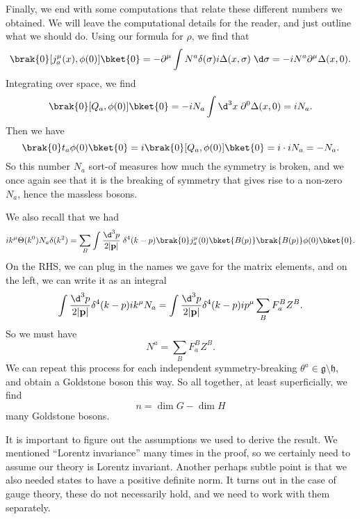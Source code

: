 \documentclass[a4paper]{article}
\begin{document}
Finally, we end with some computations that relate these different numbers we obtained. We will leave the computational details for the reader, and just outline what we should do. Using our formula for $\rho$, we find that
\[
  \brak{0} [j_a^\mu(x), \phi(0)] \bket{0} = - \partial^\mu \int N^a \delta (\sigma) i \Delta(x, \sigma) \;\d \sigma = -iN^a \partial^\mu \Delta(x, 0).
\]
Integrating over space, we find
\[
  \brak{0}[Q_a, \phi(0)]\bket{0} = - iN_a \int \d^3 x\; \partial^0 \Delta(x, 0) = i N_a.
\]
Then we have
\[
  \brak{0} t_a \phi(0)\bket{0} = i \brak{0} [Q_a, \phi(0)]\bket{0} = i \cdot i N_a = -N_a.
\]
So this number $N_a$ sort-of measures how much the symmetry is broken, and we once again see that it is the breaking of symmetry that gives rise to a non-zero $N_a$, hence the massless bosons.

We also recall that we had
\[
  i k^\mu \Theta(k^0) N_a \delta(k^2) = \sum_B \int \frac{\d^3 p}{2|\mathbf{p}|}\; \delta^4(k - p) \brak{0} j_a^\mu(0) \bket{B(p)} \brak{B(p)} \phi(0) \bket{0}.
\]
On the RHS, we can plug in the names we gave for the matrix elements, and on the left, we can write it as an integral
\[
  \int \frac{\d^3 p}{2|\mathbf{p}|} \delta^4 (k - p) i k^\mu N_a = \int \frac{\d^3 p}{2|\mathbf{p}|} \delta^4(k - p) i p^\mu \sum_B F_a^B Z^B.
\]
So we must have
\[
  N^a = \sum_B F_a^B Z^B.
\]
We can repeat this process for each independent symmetry-breaking $\theta^a \in \mathfrak{g} \setminus \mathfrak{h}$, and obtain a Goldstone boson this way. So all together, at least superficially, we find
\[
  n = \dim G - \dim H
\]
many Goldstone bosons.

%

It is important to figure out the assumptions we used to derive the result. We mentioned ``Lorentz invariance'' many times in the proof, so we certainly need to assume our theory is Lorentz invariant.
Another perhaps subtle point is that we also needed states to have a positive definite norm. It turns out in the case of gauge theory, these do not necessarily hold, and we need to work with them separately. %

\end{document}
